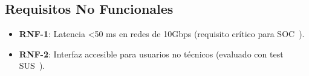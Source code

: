 \subsection{Requisitos No Funcionales}   \label{sec.req-no-funcionales}
\begin{itemize}  
    \item \textbf{RNF-1}: Latencia <50 ms en redes de 10Gbps (requisito crítico para SOC~\cite{nist2021ai}).  
    \item \textbf{RNF-2}: Interfaz accesible para usuarios no técnicos (evaluado con test SUS~\cite{brooke1996sus}).  
\end{itemize}  

